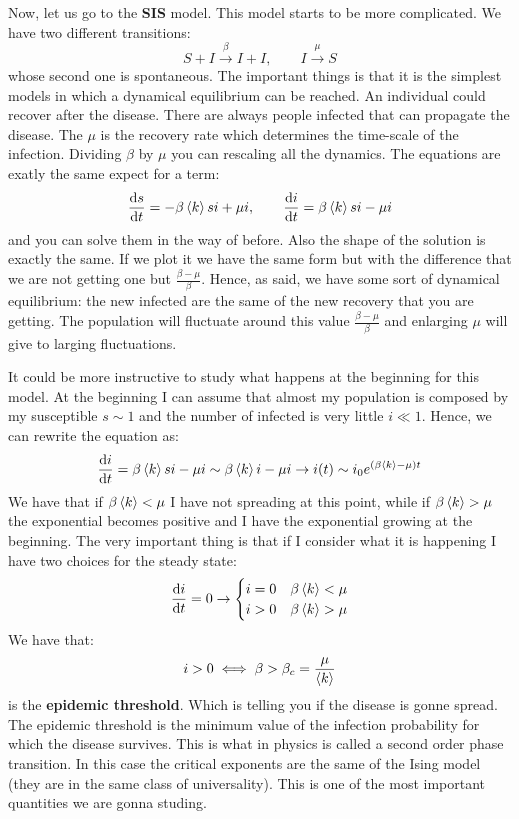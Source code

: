 \documentclass[../main/main.tex]{subfiles}
\begin{document}
Now, let us go to the \textbf{SIS} model. This model starts to be more complicated. We have two different transitions:
\begin{equation*}
  S + I \overset{\beta }{\rightarrow } I + I, \qquad I \overset{\mu }{\rightarrow } S
\end{equation*}
whose second one is spontaneous.
The important things is that it is the simplest models in which a dynamical equilibrium can be reached. An individual could recover after the disease. There are always people infected that can propagate the disease. The \( \mu  \) is the recovery rate which determines the time-scale of the infection.
Dividing \( \beta  \) by \( \mu  \) you can rescaling all the dynamics.
The equations are exatly the same expect for a term:
\begin{equation*}
  \dv{s}{t} = - \beta \expval{k} si + \mu i, \qquad \dv{i}{t} = \beta \expval{k} si - \mu i
\end{equation*}
and you can solve them in the way of before.
Also the shape of the solution is exactly the same.
If we plot it we have the same form but with the difference that we are not getting one but \( \frac{\beta - \mu }{\beta } \). Hence, as said, we have some sort of dynamical equilibrium: the new infected are the same of the new recovery that you are getting. The population will fluctuate around this value \( \frac{\beta - \mu }{\beta } \) and enlarging \( \mu  \) will give to larging fluctuations.

It could be more instructive to study what happens at the beginning for this model. At the beginning I can assume that almost my population is composed by my susceptible \( s \sim 1 \) and the number of infected is very little \( i \ll 1 \).
Hence, we can rewrite the equation as:
\begin{equation*}
  \dv{i}{t} = \beta \expval{k} s i - \mu i \sim \beta \expval{k} i - \mu i \rightarrow i(t) \sim i_0 e^{(\beta \expval{k} - \mu  )t}
\end{equation*}
We have that if \( \beta \expval{k} < \mu   \) I have not spreading at this point, while if \( \beta \expval{k} > \mu   \) the exponential becomes positive and I have the exponential growing at the beginning.
The very important thing is that if I consider what it is happening I have two choices for the steady state:
\begin{equation*}
  \dv{i}{t} = 0 \rightarrow  \begin{cases}
   i=0 & \beta \expval{k} < \mu  \\
   i>0 & \beta \expval{k} > \mu
  \end{cases}
\end{equation*}
We have that:
\begin{equation*}
  i>0 \iff \beta > \beta_c = \frac{\mu }{ \expval{k} }
\end{equation*}
is the \textbf{epidemic threshold}. Which is telling you if the disease is gonne spread.
The epidemic threshold is the minimum value of the infection probability for which the disease survives. This is what in physics is called a second order phase transition. In this case the critical exponents are the same of the Ising model (they are in the same class of universality).
This is one of the most important quantities we are gonna studing.
\end{document}
